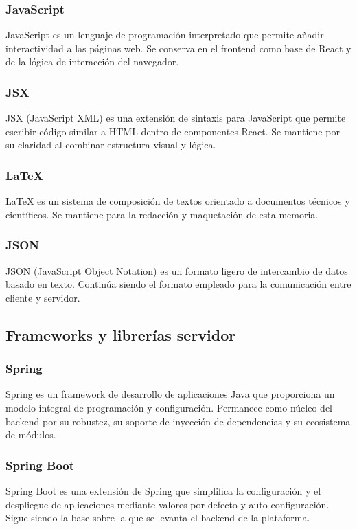 \subsubsection{JavaScript}
JavaScript \cite{javascript} es un lenguaje de programación interpretado que permite añadir interactividad a las páginas web. Se conserva en el frontend como base de React y de la lógica de interacción del navegador.

\subsubsection{JSX}
JSX (JavaScript XML) \cite{jsx} es una extensión de sintaxis para JavaScript que permite escribir código similar a HTML dentro de componentes React. Se mantiene por su claridad al combinar estructura visual y lógica.

\subsubsection{LaTeX}
LaTeX \cite{latex} es un sistema de composición de textos orientado a documentos técnicos y científicos. Se mantiene para la redacción y maquetación de esta memoria.

\subsubsection{JSON}
JSON (JavaScript Object Notation) \cite{json} es un formato ligero de intercambio de datos basado en texto. Continúa siendo el formato empleado para la comunicación entre cliente y servidor.

\subsection{Frameworks y librerías servidor}

\subsubsection{Spring}
Spring \cite{spring} es un framework de desarrollo de aplicaciones Java que proporciona un modelo integral de programación y configuración. Permanece como núcleo del backend por su robustez, su soporte de inyección de dependencias y su ecosistema de módulos.

\subsubsection{Spring Boot}
Spring Boot \cite{springboot} es una extensión de Spring que simplifica la configuración y el despliegue de aplicaciones mediante valores por defecto y auto-configuración. Sigue siendo la base sobre la que se levanta el backend de la plataforma.

